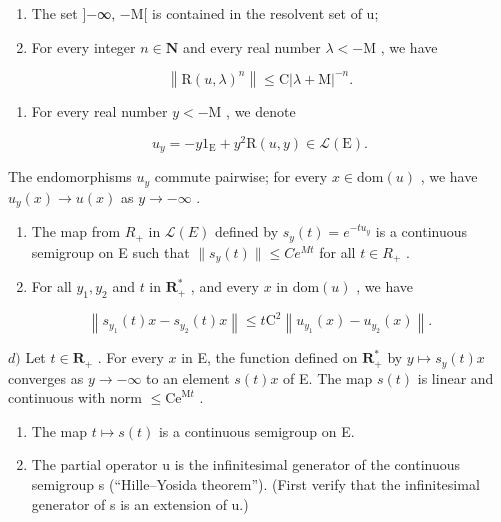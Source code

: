 \begin{enumerate}
\def\labelenumi{(\roman{enumi})}
\item
  The set {]}−∞, −M{[} is contained in the resolvent set of u;
\item
  For every integer \(n \in \mathbf{N}\) and every real number \(\lambda < -\mathrm{M}\) , we have
\end{enumerate}

\[
\left\| \mathrm{R} (u, \lambda) ^ {n} \right\| \leqslant \mathrm{C} | \lambda + \mathrm{M} | ^ {- n}.
\]

\begin{enumerate}
\def\labelenumi{\alph{enumi})}
\tightlist
\item
  For every real number \(y < -\mathrm{M}\) , we denote
\end{enumerate}

\[
u _ {y} = - y 1 _ {\mathrm{E}} + y ^ {2} \mathrm{R} (u, y) \in \mathcal {L} (\mathrm{E}).
\]

The endomorphisms \(u_{y}\) commute pairwise; for every \(x \in \text{dom}(u)\) , we have \(u_{y}(x) \to u(x)\) as \(y \to -\infty\) .

\begin{enumerate}
\def\labelenumi{\alph{enumi})}
\setcounter{enumi}{1}
\item
  The map from \(R_{+}\) in \(\mathcal{L}(E)\) defined by \(s_{y}(t)=e^{-tu_{y}}\) is a continuous semigroup on E such that \(\|s_{y}(t)\|\leqslant Ce^{Mt}\) for all \(t\in R_{+}\) .
\item
  For all \(y_{1}, y_{2}\) and \(t\) in \(\mathbf{R}_{+}^{*}\) , and every \(x\) in \(\mathrm{dom}(u)\) , we have
\end{enumerate}

\[
\left\| s _ {y _ {1}} (t) x - s _ {y _ {2}} (t) x \right\| \leqslant t \mathrm{C} ^ {2} \left\| u _ {y _ {1}} (x) - u _ {y _ {2}} (x) \right\|.
\]

\(d)\) Let \(t \in \mathbf{R}_{+}\) . For every \(x\) in E, the function defined on \(\mathbf{R}_{+}^{*}\) by \(y \mapsto s_{y}(t)x\) converges as \(y \to -\infty\) to an element \(s(t)x\) of E. The map \(s(t)\) is linear and continuous with norm \(\leqslant \mathrm{Ce}^{\mathrm{M}t}\) .

\begin{enumerate}
\def\labelenumi{\alph{enumi})}
\setcounter{enumi}{4}
\item
  The map \(t \mapsto s(t)\) is a continuous semigroup on E.
\item
  The partial operator u is the infinitesimal generator of the continuous semigroup s (“Hille–Yosida theorem”). (First verify that the infinitesimal generator of s is an extension of u.)
\end{enumerate}

